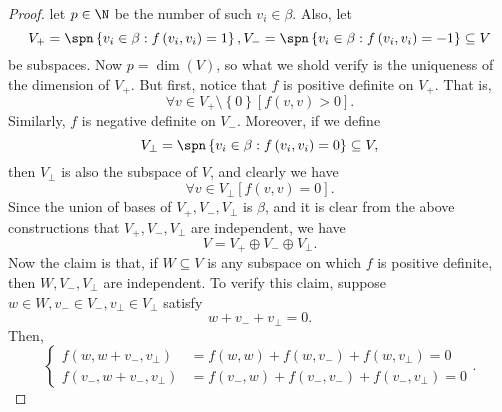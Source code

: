 \documentclass[linearalgebraII]{subfiles}
\begin{document}
\begin{proof}
        let $p\in\N$ be the number of such $v_i\in\beta$. Also, let
        \begin{equation*}
            V_+ = \spn\left\lbrace v_i\in\beta: f\left( v_i,v_i \right) =1 \right\rbrace , V_-=\spn\left\lbrace v_i\in\beta: f\left( v_i,v_i \right) = -1 \right\rbrace \subseteq V 
        \end{equation*}
        be subspaces. Now $p=\dim\left( V \right)$, so what we shold verify is the uniqueness of the dimension of $V_+$. But first, notice that $f$ is positive definite on $V_+$. That is,
        \begin{equation*}
            \forall v\in V_+\setminus \left\lbrace 0 \right\rbrace \left[ f\left( v,v \right) > 0 \right].
        \end{equation*}
        Similarly, $f$ is negative definite on $V_-$. Moreover, if we define
        \begin{equation*}
            V_\perp = \spn\left\lbrace v_i\in\beta: f\left( v_i,v_i \right) =0 \right\rbrace \subseteq V,
        \end{equation*}
        then $V_\perp$ is also the subspace of $V$, and clearly we have
        \begin{equation*}
            \forall v\in V_\perp \left[ f\left( v,v \right) = 0 \right].
        \end{equation*}
        Since the union of bases of $V_+, V_-, V_\perp$ is $\beta$, and it is clear from the above constructions that $V_+, V_-, V_\perp$ are independent, we have
        \begin{equation*}
            V = V_+\oplus V_-\oplus V_\perp.
        \end{equation*}
        Now the claim is that, if $W\subseteq V$ is any subspace on which $f$ is positive definite, then $W, V_-, V_\perp$ are independent. To verify this claim, suppose $w\in W, v_-\in V_-, v_\perp\in V_\perp$ satisfy
        \begin{equation*}
            w + v_- + v_\perp = 0.
        \end{equation*}
        Then,
        \begin{equation*}
            \begin{cases} 
                f\left( w, w+v_-,v_\perp \right) & = f\left( w,w \right) + f\left( w,v_- \right) + f\left( w,v_\perp \right) = 0 \\
                f\left( v_-, w+v_-,v_\perp \right) & = f\left( v_-,w \right) + f\left( v_-,v_- \right) + f\left( v_-,v_\perp \right) = 0 
            \end{cases}.

\end{equation*}
\end{proof}
\end{document}
